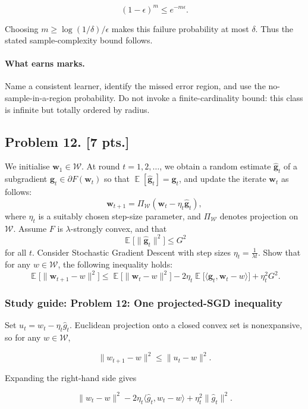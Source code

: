 \documentclass[11pt,a4paper]{article}
\DeclareMathOperator{\E}{\mathbb{E}}
\begin{document}
\[
(1-\epsilon)^m
\leq
e^{-m\epsilon}.
\]

Choosing $m\geq \log(1/\delta)/\epsilon$ makes this failure probability at most $\delta$. Thus the stated sample-complexity bound follows.

\paragraph{What earns marks.}

Name a consistent learner, identify the missed error region, and use the no-sample-in-a-region probability. Do not invoke a finite-cardinality bound: this class is infinite but totally ordered by radius.



\subsection{Problem 12. [7 pts.]}
We initialise $\mathbf{w}_1 \in \mathcal{W}$. At round $t = 1, 2, \dots$, we obtain a random estimate $\hat{\mathbf{g}}_t$ of a subgradient $\mathbf{g}_t \in \partial F(\mathbf{w}_t)$ so that $\E[\hat{\mathbf{g}}_t] = \mathbf{g}_t$, and update the iterate $\mathbf{w}_t$ as follows:
\[
\mathbf{w}_{t+1} = \Pi_{\mathcal{W}}(\mathbf{w}_t - \eta_t \hat{\mathbf{g}}_t),
\]
where $\eta_t$ is a suitably chosen step-size parameter, and $\Pi_{\mathcal{W}}$ denotes projection on $\mathcal{W}$. Assume $F$ is $\lambda$-strongly convex, and that
\[
\E\bigl[ \|\hat{\mathbf{g}}_t\|^{2} \bigr] \le G^{2}
\]
for all $t$. Consider Stochastic Gradient Descent with step sizes $\eta_t = \frac{1}{\lambda t}$.
Show that for any $w \in \mathcal{W}$, the following inequality holds:
\[
\E\bigl[ \|\mathbf{w}_{t+1} - w\|^{2} \bigr] \le \E\bigl[ \|\mathbf{w}_t - w\|^{2} \bigr] - 2\eta_t \E\bigl[ \langle \mathbf{g}_t, \mathbf{w}_t - w \rangle \bigr] + \eta_t^{2} G^{2}.
\]


\subsubsection{Study guide: Problem 12: One projected-SGD inequality}

Set $u_t=w_t-\eta_t\hat g_t$. Euclidean projection onto a closed convex set is nonexpansive, so for any $w\in\mathcal{W}$,

\[
\|w_{t+1}-w\|^2
\leq
\|u_t-w\|^2.
\]

Expanding the right-hand side gives

\[
\|w_t-w\|^2
-2\eta_t\langle \hat g_t,w_t-w\rangle
+\eta_t^2\|\hat g_t\|^2.
\]
\end{document}
